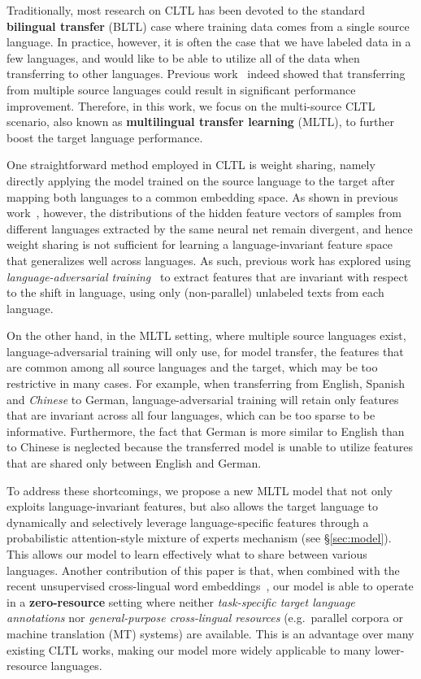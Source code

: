\documentclass[11pt,a4paper]{article}
\newcommand{\newterm}[1]{{\bf #1}}
\newcommand{\secref}[1]{\S\ref{#1}}
\begin{document}
Traditionally, most research on CLTL has been devoted to the standard \newterm{bilingual transfer} (BLTL) case where training data comes from a single source language.
In practice, however, it is often the case that we have labeled data in a few languages, and would like to be able to utilize all of the data when transferring to other languages.
Previous work~\cite{McDonald:2011:MTD:2145432.2145440} indeed showed that transferring from multiple source languages could result in significant performance improvement.
Therefore, in this work, we focus on the multi-source CLTL scenario, also known as \newterm{multilingual transfer learning} (MLTL), to further boost the target language performance.

One straightforward method employed in CLTL is weight sharing, namely directly applying the model trained on the source language to the target after mapping both languages to a common embedding space.
As shown in previous work~\citep{chen2016adan}, however, the distributions of the hidden feature vectors of samples from different languages extracted by the same neural net remain divergent, and hence weight sharing is not sufficient for learning a language-invariant feature space that generalizes well across languages.
As such, previous work has explored using \emph{language-adversarial training}~\citep{chen2016adan,D17-1302} to extract features that are invariant with respect to the shift in language, using only (non-parallel) unlabeled texts from each language. 

On the other hand, in the MLTL setting, where multiple source languages exist, language-adversarial training will only use, for model transfer, the features that are common among all source languages and the target, which may be too restrictive in many cases.
For example, when transferring from English, Spanish and \emph{Chinese} to German, language-adversarial training will retain only features that are invariant across all four languages, which can be too sparse to be informative.
Furthermore, the fact that German is more similar to English than to Chinese is neglected because the transferred model is unable to utilize features that are shared only between English and German.

To address these shortcomings, we propose a new MLTL model that not only exploits language-invariant features, but also allows the target language to dynamically and selectively leverage language-specific features through a probabilistic attention-style mixture of experts mechanism (see \secref{sec:model}). This allows our model to learn effectively what to share between various languages.
Another contribution of this paper is that, when combined with the recent unsupervised cross-lingual word embeddings~\cite{lample2018word,chen2018umwe}, our model is able to operate in a \newterm{zero-resource} setting where neither \emph{task-specific target language annotations} nor \emph{general-purpose cross-lingual resources} (e.g.~parallel corpora or machine translation (MT) systems) are available.
This is an advantage over many existing CLTL works, making our model more widely applicable to many lower-resource languages.
\end{document}
